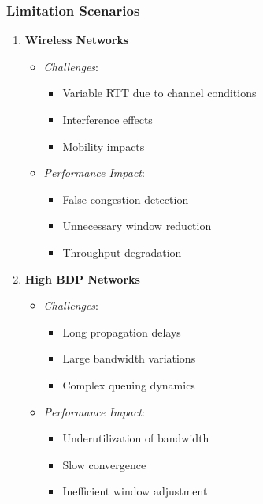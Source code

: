\documentclass[11pt,a4paper]{article}
\begin{document}
\begin{tcolorbox}[
    enhanced,
    colback=white,
    colframe=green!75!black,
    title=Limitation Scenarios]
\subsubsection{Limitation Scenarios}
\begin{enumerate}
    \item \textbf{Wireless Networks}
    \begin{itemize}
        \item \textit{Challenges}:
        \begin{itemize}
            \item Variable RTT due to channel conditions
            \item Interference effects
            \item Mobility impacts
        \end{itemize}
        \item \textit{Performance Impact}:
        \begin{itemize}
            \item False congestion detection
            \item Unnecessary window reduction
            \item Throughput degradation
        \end{itemize}
    \end{itemize}

    \item \textbf{High BDP Networks}
    \begin{itemize}
        \item \textit{Challenges}:
        \begin{itemize}
            \item Long propagation delays
            \item Large bandwidth variations
            \item Complex queuing dynamics
        \end{itemize}
        \item \textit{Performance Impact}:
        \begin{itemize}
            \item Underutilization of bandwidth
            \item Slow convergence
            \item Inefficient window adjustment
        \end{itemize}
    \end{itemize}


\end{enumerate}
\end{tcolorbox}
\end{document}
